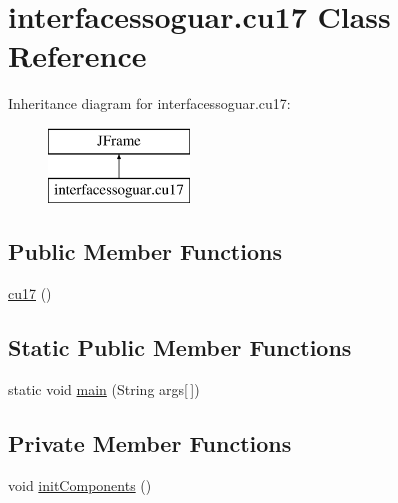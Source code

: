 \hypertarget{classinterfacessoguar_1_1cu17}{}\section{interfacessoguar.\+cu17 Class Reference}
\label{classinterfacessoguar_1_1cu17}
Inheritance diagram for interfacessoguar.\+cu17\+:\begin{figure}[H]
\begin{center}
\leavevmode
\includegraphics[height=2.000000cm]{classinterfacessoguar_1_1cu17}
\end{center}
\end{figure}
\subsection*{Public Member Functions}
\begin{DoxyCompactItemize}
\item 
\mbox{\hyperlink{classinterfacessoguar_1_1cu17_a6cfceedd011127f9629cc5a686dbe81a}{cu17}} ()
\end{DoxyCompactItemize}
\subsection*{Static Public Member Functions}
\begin{DoxyCompactItemize}
\item 
static void \mbox{\hyperlink{classinterfacessoguar_1_1cu17_ad9063e8cb97f8c0de440afc450b0ffff}{main}} (String args\mbox{[}$\,$\mbox{]})
\end{DoxyCompactItemize}
\subsection*{Private Member Functions}
\begin{DoxyCompactItemize}
\item 
void \mbox{\hyperlink{classinterfacessoguar_1_1cu17_a3aaa3b6f470aaa30b091048b247262b1}{init\+Components}} ()
\end{DoxyCompactItemize}
